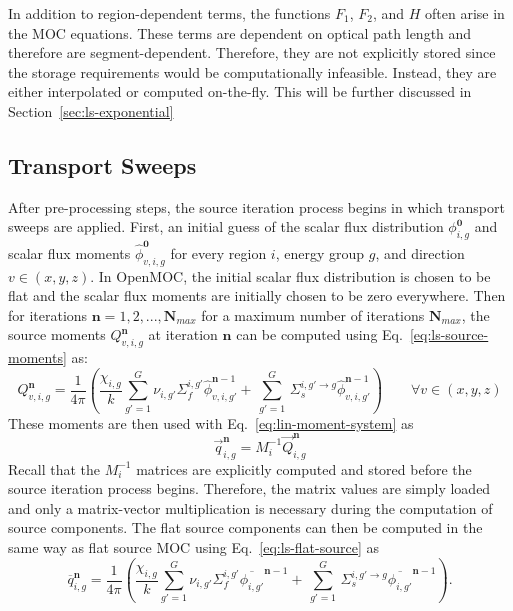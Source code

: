 In addition to region-dependent terms, the functions $F_1$, $F_2$, and $H$ often arise in the \ac{MOC} equations. These terms are dependent on optical path length and therefore are segment-dependent. Therefore, they are not explicitly stored since the storage requirements would be computationally infeasible. Instead, they are either interpolated or computed on-the-fly. This will be further discussed in Section~\ref{sec:ls-exponential}

\subsection{Transport Sweeps}

After pre-processing steps, the source iteration process begins in which transport sweeps are applied. First, an initial guess of the scalar flux distribution $\phi_{i,g}^{\mathbf{0}}$ and scalar flux moments $\hat{\phi}_{v,i,g}^{\mathbf{0}}$ for every region $i$, energy group $g$, and direction $v \in (x,y,z)$. In OpenMOC, the initial scalar flux distribution is chosen to be flat and the scalar flux moments are initially chosen to be zero everywhere. Then for iterations $\mathbf{n} = 1,2,...,\mathbf{N_{\textit{max}}}$ for a maximum number of iterations $\mathbf{N_{\textit{max}}}$, the source moments $Q_{v,i,g}^{\mathbf{n}}$ at iteration $\mathbf{n}$ can be computed using Eq.~\ref{eq:ls-source-moments} as:
\begin{equation}
Q_{v,i,g}^{\mathbf{n}} = \frac{1}{4 \pi} \left( \frac{\chi_{i,g}}{k} \sum_{g'=1}^{G} \nu_{i,g'} \Sigma_f^{i,g'} \hat{\phi}_{v,i,g'}^{\mathbf{n}-1} + \, \sum_{g'=1}^G \,  \Sigma_{s}^{i,g' \rightarrow g} \hat{\phi}_{v,i,g'}^{\mathbf{n}-1} \right) \qquad \forall v \in (x,y,z)
\end{equation}
These moments are then used with Eq.~\ref{eq:lin-moment-system} as
\begin{equation}
\vec{q}_{i,g}^{\mathbf{n}} = M_i^{-1} \vec{Q}_{i,g}^{\mathbf{n}}
\end{equation}
Recall that the $M_i^{-1}$ matrices are explicitly computed and stored before the source iteration process begins. Therefore, the matrix values are simply loaded and only a matrix-vector multiplication is necessary during the computation of source components. The flat source components can then be computed in the same way as flat source \ac{MOC} using Eq.~\ref{eq:ls-flat-source} as
\begin{equation}
\overline{q}_{i,g}^{\mathbf{n}} = \frac{1}{4 \pi} \left( \frac{\chi_{i,g}}{k} \sum_{g'=1}^{G} \nu_{i,g'} \Sigma_f^{i,g'} \overline{\phi_{i,g'}}^{\mathbf{n}-1} + \, \sum_{g'=1}^G \,  \Sigma_{s}^{i,g' \rightarrow g} \overline{\phi_{i,g'}}^{\mathbf{n}-1} \right).
\end{equation}
